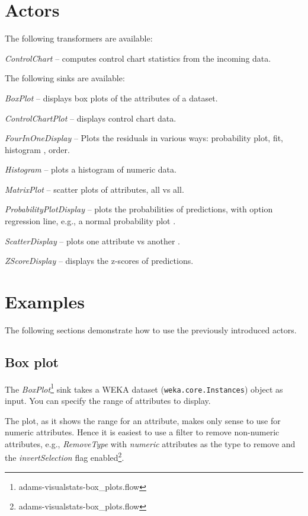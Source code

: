 \documentclass[a4paper]{book}
\begin{document}
\section{Actors}
The following transformers are available:
\begin{tight_itemize}
	\item \textit{ControlChart} -- computes control chart statistics from the
	incoming data.
\end{tight_itemize}
The following sinks are available:
\begin{tight_itemize}
	\item \textit{BoxPlot} -- displays box plots \cite{boxplot} of the attributes
	of a dataset.
	\item \textit{ControlChartPlot} -- displays control chart data.
	\item \textit{FourInOneDisplay} -- Plots the residuals\cite{4in1} in various ways:
	probability plot, fit, histogram \cite{histogram}, order.
	\item \textit{Histogram} -- plots a histogram\cite{histogram} of numeric data.
	\item \textit{MatrixPlot} -- scatter plots of attributes, all vs all.
	\item \textit{ProbabilityPlotDisplay} -- plots the probabilities of 
	predictions, with option regression line, e.g., a normal probability
	plot \cite{normalprobplot}.
	\item \textit{ScatterDisplay} -- plots one attribute vs another 
	\cite{scatterplot}.
	\item \textit{ZScoreDisplay} -- displays the z-scores of predictions.
\end{tight_itemize}

\newpage
\section{Examples}
The following sections demonstrate how to use the previously introduced actors.

\subsection{Box plot}
The \textit{BoxPlot}\footnote{adams-visualstats-box\_plots.flow} sink takes
a WEKA dataset (\texttt{weka.core.Instances}) object as input. You can specify
the range of attributes to display.

The plot, as it shows the range for an attribute, makes only sense to use for
numeric attributes. Hence it is easiest to use a filter to remove non-numeric
attributes, e.g., \textit{RemoveType} with \textit{numeric} attributes as the
type to remove and the \textit{invertSelection} flag 
enabled\footnote{adams-visualstats-box\_plots.flow}.
\end{document}
